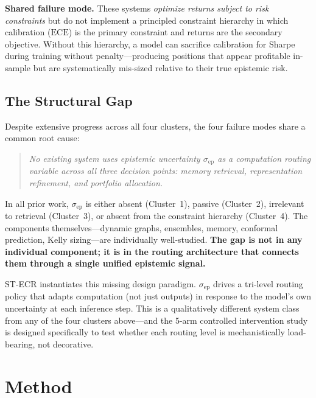 \documentclass[11pt,a4paper]{article}
\newcommand{\sep}{\sigma_{\mathrm{ep}}}
\newcommand{\ECE}{\mathrm{ECE}}
\begin{document}
\textbf{Shared failure mode.}
These systems \emph{optimize returns subject to risk constraints} but do not
implement a principled constraint hierarchy in which calibration ($\ECE$) is
the primary constraint and returns are the secondary objective.  Without this
hierarchy, a model can sacrifice calibration for Sharpe during training
without penalty—producing positions that appear profitable in-sample but are
systematically mis-sized relative to their true epistemic risk.

\subsection*{The Structural Gap}
\label{sec:gap}

Despite extensive progress across all four clusters, the four failure modes
share a common root cause:

\begin{quote}
\emph{No existing system uses epistemic uncertainty $\sep$ as a computation
routing variable across all three decision points: memory retrieval,
representation refinement, and portfolio allocation.}
\end{quote}

In all prior work, $\sep$ is either absent (Cluster~1), passive (Cluster~2),
irrelevant to retrieval (Cluster~3), or absent from the constraint hierarchy
(Cluster~4).  The components themselves—dynamic graphs, ensembles, memory,
conformal prediction, Kelly sizing—are individually well-studied.
\textbf{The gap is not in any individual component; it is in the routing
architecture that connects them through a single unified epistemic signal.}

ST-ECR instantiates this missing design paradigm.  $\sep$ drives a tri-level
routing policy that adapts computation (not just outputs) in response to the
model's own uncertainty at each inference step.  This is a qualitatively
different system class from any of the four clusters above—and the 5-arm
controlled intervention study is designed specifically to test whether each
routing level is mechanistically load-bearing, not decorative.

\section{Method}
\label{sec:method}
\end{document}
